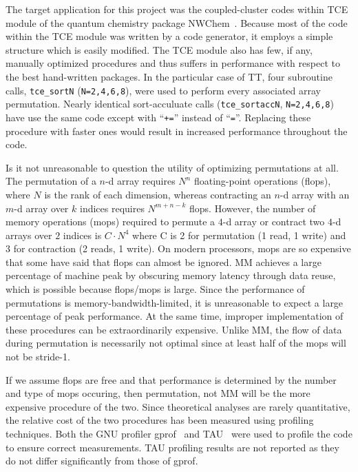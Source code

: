\documentclass[letterpaper,12pt]{article}
\begin{document}
The target application for this project was the coupled-cluster codes within TCE module of the quantum chemistry package NWChem~\cite{NWChem}.  Because most of the code within the TCE module was written by a code generator, it employs a simple structure which is easily modified.  The TCE module also has few, if any, manually optimized procedures and thus suffers in performance with respect to the best hand-written packages.  In the particular case of TT, four subroutine calls, \texttt{tce\_sortN} (\texttt{N=2,4,6,8}), were used to perform every associated array permutation.  Nearly identical sort-acculuate calls (\texttt{tce\_sortaccN}, \texttt{N=2,4,6,8}) have use the same code except with ``\texttt{+=}'' instead of ``\texttt{=}''.  Replacing these procedure with faster ones would result in increased performance throughout the code.

Is it not unreasonable to question the utility of optimizing permutations at all.  The permutation of a $n$-d array requires $N^n$ floating-point operations (flops), where $N$ is the rank of each dimension, whereas contracting an $n$-d array with an $m$-d array over $k$ indices requires $N^{m+n-k}$ flops.  However, the number of memory operations (mops) required to permute a $4$-d array or contract two $4$-d arrays over $2$ indices is $C{\cdot}N^4$ where C is 2 for permutation (1 read, 1 write) and 3 for contraction (2 reads, 1 write).  On modern processors, mops are so expensive that some have said that flops can almost be ignored.  MM achieves a large percentage of machine peak by obscuring memory latency through data reuse, which is possible because flops/mops is large.  Since the performance of permutations is memory-bandwidth-limited, it is unreasonable to expect a large percentage of peak performance.   At the same time, improper implementation of these procedures can be extraordinarily expensive.  Unlike MM, the flow of data during permutation is necessarily not optimal since at least half of the mops will not be stride-1.

If we assume flops are free and that performance is determined by the number and type of mops occuring, then permutation, not MM will be the more expensive procedure of the two.  Since theoretical analyses are rarely quantitative, the relative cost of the two procedures has been measured using profiling techniques.  Both the GNU profiler gprof~\cite{GPROF} and TAU~\cite{TAU} were used to profile the code to ensure correct measurements.  TAU profiling results are not reported as they do not differ significantly from those of gprof.
\end{document}
